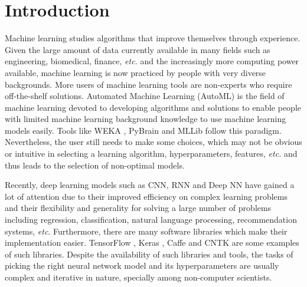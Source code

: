 \documentclass[12pt]{elsart}%
\begin{document}
%


\section{Introduction}

Machine learning studies algorithms that improve themselves through experience. Given the large amount of data currently available in many fields such as engineering, biomedical, finance, \textit{etc.} and the increasingly more computing power available, machine learning is now practiced by people with very diverse backgrounds. More users of machine learning tools are non-experts who require off-the-shelf solutions. Automated Machine Learning (AutoML) is the field of machine learning devoted to developing algorithms and solutions to enable people with limited machine learning background knowledge to use machine learning models easily. Tools like WEKA \cite{Hall2009}, PyBrain \cite{Schaul2010} and MLLib \cite{mlib2017} follow this paradigm. Nevertheless, the user still needs to make some choices, which may not be obvious or intuitive in selecting a learning algorithm, hyperparameters, features, \textit{etc.} and thus leads to the selection of non-optimal models.

Recently, deep learning models such as CNN, RNN and Deep NN have gained a lot of attention due to their improved efficiency on complex learning problems and their flexibility and generality for solving a large number of problems including regression, classification, natural language processing, recommendation systems, \textit{etc}. Furthermore, there are many software libraries which make their implementation easier. TensorFlow \cite{TensorFlow2015}, Keras \cite{keras2015}, Caffe \cite{caffe2014} and CNTK \cite{cntk2016} are some examples of such libraries. Despite the availability of such libraries and tools, the tasks of picking the right neural network model and its hyperparameters are usually complex and iterative in nature, specially among non-computer scientists.
\end{document}
